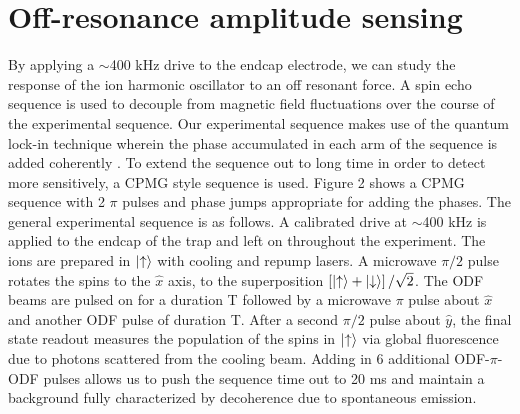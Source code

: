 \documentclass[aps,prl,twocolumn,superscriptaddress,floatfix]{revtex4-1}
\begin{document}
\section{Off-resonance amplitude sensing}
By applying a $\sim$400 kHz drive to the endcap electrode, we can study the response of the ion harmonic oscillator to an off resonant force. A spin echo sequence is used to decouple from magnetic field fluctuations over the course of the experimental sequence. Our experimental sequence makes use of the quantum lock-in technique wherein the phase accumulated in each arm of the sequence is added coherently \citep{Kotler2011}. To extend the sequence out to long time in order to detect more sensitively, a CPMG style sequence is used. Figure 2 shows a CPMG sequence with 2 $\pi$ pulses and phase jumps appropriate for adding the phases. The general experimental sequence is as follows. A calibrated drive at $\sim$400 kHz is applied to the endcap of the trap and left on throughout the experiment. The ions are prepared in $\ket{\uparrow}$ with cooling and repump lasers. A microwave $\pi/2$ pulse rotates the spins to the $\hat{x}$ axis, to the superposition $\left[\ket{\uparrow} + \ket{\downarrow}\right]/\sqrt{2}$. The ODF beams are pulsed on for a duration T followed by a microwave $\pi$ pulse about $\hat{x}$ and another ODF pulse of duration T. After a second $\pi/2$ pulse about $\hat{y}$, the final state readout measures the population of the spins in $\ket{\uparrow}$ via global fluorescence due to photons scattered from the cooling beam. Adding in 6 additional ODF-$\pi$-ODF pulses allows us to push the sequence time out to 20 ms and maintain a background fully characterized by decoherence due to spontaneous emission.
\end{document}
